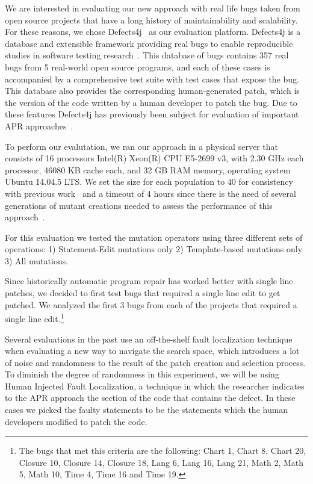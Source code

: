 \documentclass[conference]{IEEEtran}
\begin{document}
We are interested in evaluating our new approach with real life bugs taken from 
open source projects that have a long history of maintainability and 
scalability. For these reasons, we chose Defects4j~\cite{just14} as our 
evaluation platform. Defects4j is a database and extensible 
framework providing real bugs to enable reproducible studies in software testing 
research~\cite{just14}. This database of bugs contains 357 real bugs from 5 
real-world open source programs, and each of these cases is accompanied by a 
comprehensive test suite with test cases that expose the bug. This database also provides 
the corresponding human-generated patch, which is the version of the code written by a human 
developer to patch the bug. Due to these features Defects4j has previously been 
subject for evaluation of important APR approaches~\cite{Durieux15}.

To perform our evalutation, we ran our approach in a physical server that 
consists of 16 processors Intel(R) Xeon(R) CPU E5-2699 v3, with 2.30 GHz each 
processor, 46080 KB cache each, and 32 GB RAM memory, operating system Ubuntu 
14.04.5 LTS. We set the size for each population to 40 for consistency with 
previous work~\cite{legoues12,kim2013} and a timeout of 4 hours since there is 
the need of several generations of mutant creations needed to assess the 
performance of this approach~\cite{arcuri11}.

For this evaluation we tested the mutation operators using three different sets 
of operations: 1) Statement-Edit mutations only 2) Template-based mutations 
only 3) All mutations.

Since historically automatic program repair has worked better with single line 
patches, we decided to first test bugs that required a single line edit to get 
patched. We analyzed the first 3 bugs from each of the projects that required a 
single line edit.\footnote{The bugs that met this criteria are the following: Chart 1, 
Chart 8, Chart 20, Closure 10, Closure 14, Closure 18, Lang 6, Lang 16, Lang 21, 
Math 2, Math 5, Math 10, Time 4, Time 16 and Time 19.}

Several evaluations in the past use an off-the-shelf fault localization technique when evaluating a new way to navigate the search space, which introduces a lot of noise and randomness to the result of the patch creation and selection process. To diminish the degree of randomness in this experiment, we will be using Human Injected Fault Localization, a technique in which the researcher indicates to the APR approach the section of the code that contains the defect. In these cases we picked the faulty statements to be the statements which the human developers modified to patch the code.
\end{document}
